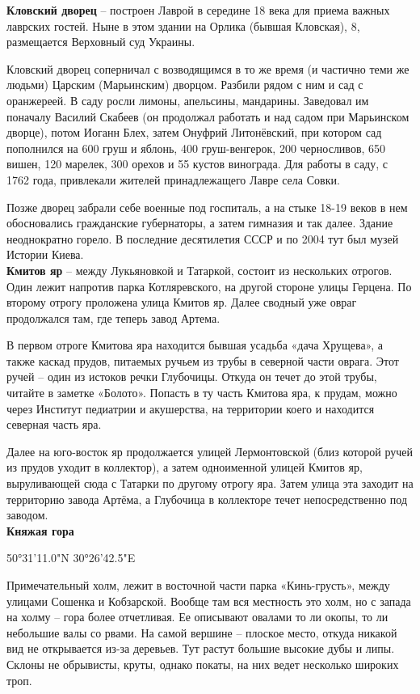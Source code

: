 \textbf{Кловский дворец} – построен Лаврой в середине 18 века для приема важных лаврских гостей. Ныне в этом здании на Орлика (бывшая Кловская), 8, размещается Верховный суд Украины. 

Кловский дворец соперничал с возводящимся в то же время (и частично теми же людьми) Царским (Марьинским) дворцом. Разбили рядом с ним и сад с оранжереей. В саду росли лимоны, апельсины, мандарины. Заведовал им поначалу Василий Скабеев (он продолжал работать и над садом при Марьинском дворце), потом Иоганн Блех, затем Онуфрий Литонёвский, при котором сад пополнился на 600 груш и яблонь, 400 груш-венгерок, 200 черносливов, 650 вишен, 120 марелек, 300 орехов и 55 кустов винограда. Для работы в саду, с 1762 года, привлекали жителей принадлежащего Лавре села Совки.

Позже дворец забрали себе военные под госпиталь, а на стыке 18-19 веков в нем обосновались гражданские губернаторы, а затем гимназия и так далее. Здание неоднократно горело. В последние десятилетия СССР и по 2004 тут был музей Истории Киева.\\

\textbf{Кмитов яр} – между Лукьяновкой и Татаркой, состоит из нескольких отрогов. Один 
лежит напротив парка Котляревского, на другой стороне улицы Герцена. По второму отрогу проложена улица Кмитов яр. Далее сводный уже овраг продолжался там, где теперь завод Артема.

В первом отроге Кмитова яра находится бывшая усадьба «дача Хрущева», а также каскад прудов, питаемых ручьем из трубы в северной части оврага. Этот ручей – один из истоков речки Глубочицы. Откуда он течет до этой трубы, читайте в заметке «Болото». Попасть в ту часть Кмитова яра, к прудам, можно через Институт педиатрии и акушерства, на территории коего и находится северная часть яра.

Далее на юго-восток яр продолжается улицей Лермонтовской (близ которой ручей из прудов уходит в коллектор), а затем одноименной улицей Кмитов яр, выруливающей сюда с Татарки по другому отрогу яра. Затем улица эта заходит на территорию завода Артёма, а Глубочица в коллекторе течет непосредственно под заводом.\\

\textbf{Княжая гора} 

50°31'11.0"N 30°26'42.5"E

Примечательный холм, лежит в восточной части парка «Кинь-грусть», между улицами Сошенка и Кобзарской. Вообще там вся местность это холм, но с запада на холму – гора более отчетливая. Ее описывают овалами то ли окопы, то ли небольшие валы со рвами. На самой вершине – плоское место, откуда никакой вид не открывается из-за деревьев. Тут растут большие высокие дубы и липы. Склоны не обрывисты, круты, однако покаты, на них ведет несколько широких троп. 

